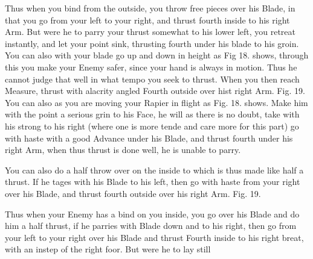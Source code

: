 Thus when you bind from the outside, you throw free pieces over his
Blade, in that you go from your left to your right, and thrust fourth
inside to his right Arm. But were he to parry your thrust somewhat to
his lower left, you retreat instantly, and let your point sink,
thrusting fourth under his blade to his groin. You can also with your
blade go up and down in height as Fig 18. shows, through this you make
your Enemy safer,
since your hand is always in motion. Thus he cannot judge that well in
what tempo you seek to thrust. When you then reach Measure, thrust
with alacrity angled Fourth outside over hist right Arm. Fig. 19. You
can also as you are moving your Rapier in flight as
Fig. 18. shows. Make him with the point a serious grin to his Face, he
will as there is no doubt, take with his strong to his right (where
one is more tende and care more for this part) go with haste with a
good Advance under his Blade, and thrust fourth under his right Arm,
when thus thrust is done well, he is unable to parry.

\exercise{}


You can also do a half throw over on the inside to which is thus made
like half a thrust. If he tages with his Blade to his left, then go
with haste from your right over his Blade, and thrust fourth outside
over his right Arm. Fig. 19.

\exercise{}


Thus when your Enemy has a bind on you inside, you go over his Blade
and do him a half thrust, if he parries with Blade down and to his
right, then go from your left to your right over his Blade and thrust
Fourth inside to his right breat, with an instep of the right
foor. But were he to lay still
